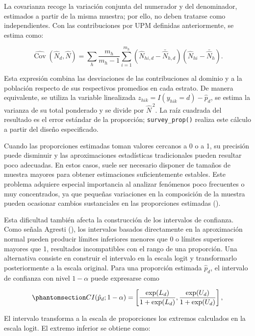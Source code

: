 \documentclass[
  spanish,
  11pt,
  letterpaper,
  oneside,
  open=any]{scrbook}
\begin{document}
La covarianza recoge la variación conjunta del numerador y del
denominador, estimados a partir de la misma muestra; por ello, no deben
tratarse como independientes. Con las contribuciones por UPM definidas
anteriormente, se estima como:

\[
\widehat{\operatorname{Cov}}(\hat{N}_d,\hat{N})
=\sum_h\frac{m_h}{m_h-1}\sum_{i=1}^{m_h}
(\hat{N}_{hi,d}-\bar{\hat{N}}_{h,d})(\hat{N}_{hi}-\bar{\hat{N}}_h).
\]

Esta expresión combina las desviaciones de las contribuciones al dominio
y a la población respecto de sus respectivos promedios en cada estrato.
De manera equivalente, se utiliza la variable linealizada
\(z_{hik}=I(y_{hik}=d)-\hat{p}_d\), se estima la varianza de su total
ponderado y se divide por \(\hat{N}^{\,2}\). La raíz cuadrada del
resultado es el error estándar de la proporción; \texttt{survey\_prop()}
realiza este cálculo a partir del diseño especificado.

Cuando las proporciones estimadas toman valores cercanos a 0 o a 1, su
precisión puede disminuir y las aproximaciones estadísticas
tradicionales pueden resultar poco adecuadas. En estos casos, suele ser
necesario disponer de tamaños de muestra mayores para obtener
estimaciones suficientemente estables. Este problema adquiere especial
importancia al analizar fenómenos poco frecuentes o muy concentrados, ya
que pequeñas variaciones en la composición de la muestra pueden
ocasionar cambios sustanciales en las proporciones estimadas
().

Esta dificultad también afecta la construcción de los intervalos de
confianza. Como señala Agresti (),
los intervalos basados directamente en la aproximación normal pueden
producir límites inferiores menores que 0 o límites superiores mayores
que 1, resultados incompatibles con el rango de una proporción. Una
alternativa consiste en construir el intervalo en la escala logit y
transformarlo posteriormente a la escala original. Para una proporción
estimada \(\hat{p}_d\), el intervalo de confianza con nivel \(1-\alpha\)
puede expresarse como

\begin{equation}\protect\phantomsection\label{eq-intervalo-proporcion-logit}{
CI(\hat{p}_d;1-\alpha)
=
\left[
\frac{\exp(L_d)}{1+\exp(L_d)},
\frac{\exp(U_d)}{1+\exp(U_d)}
\right],
}\end{equation}

El intervalo transforma a la escala de proporciones los extremos
calculados en la escala logit. El extremo inferior se obtiene como:
\end{document}
